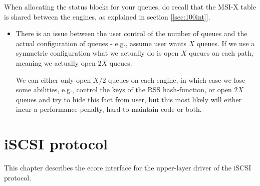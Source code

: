 \documentclass[11pt,fleqn,hidelinks,oneside]{book} %
\newenvironment{warning}
	{\par\begin{mdframed}[style=MyMdStyle] \begin{Warning}}
	{\end{Warning}\end{mdframed}\vspace{5pt}\par}
\newenvironment{NOTICE}
  {\par\begin{mdframed}[style=MyMdStyle,outerlinecolor=black,%
  						linecolor=black, outerlinewidth=1.5pt]%
    \begin{itemize}{}{\leftmargin=1cm
                   \labelwidth=\leftmargin}\item[\Large\Info]}
  {\end{itemize}\end{mdframed}\par}
\begin{document}
\begin{warning}
	When allocating the status blocks for your queues, do recall that the MSI-X table is shared between the engines, as explained in section [\ref{sec:100int}].
\end{warning}

\begin{NOTICE}
	There is an issue between the user control of the number of queues and the actual configuration of queues - e.g., assume user wants $X$ queues. If we use a symmetric configuration what we actually do is open $X$ queues on each path, meaning we actually open $2X$ queues.

	We can either only open $X/2$ queues on each engine, in which case we lose some abilities, e.g., control the keys of the RSS hash-function, or open $2X$ queues and try to hide this fact from user, but this most likely will either incur a performance penalty, hard-to-maintain code or both.
\end{NOTICE}

\chapter{iSCSI protocol}
\label{cha:iscsi}

This chapter describes the ecore interface for the upper-layer driver of the iSCSI protocol.
\end{document}
